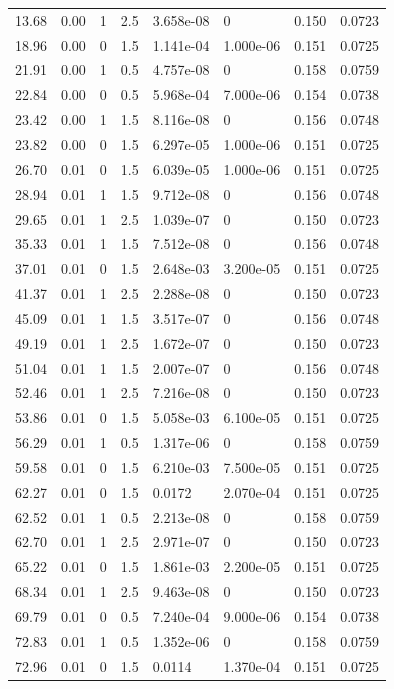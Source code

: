 \documentclass[preview]{standalone}
\begin{document}
{{\begin{tabular}{L{1.2cm}C{1.2cm} C{0.3cm}C{0.5cm} C{1.4cm}C{1.4cm} C{1.4cm}C{1.4cm}}
  13.68  &  0.00  & 1     & 2.5 &  3.658e-08  & 0  & 0.150 &  0.0723   \\ 
  18.96  &  0.00  & 0     & 1.5 &  1.141e-04  & 1.000e-06  & 0.151 &  0.0725   \\ 
  21.91  &  0.00  & 1     & 0.5 &  4.757e-08  & 0  & 0.158 &  0.0759   \\ 
  22.84  &  0.00  & 0     & 0.5 &  5.968e-04  & 7.000e-06  & 0.154 &  0.0738   \\ 
  23.42  &  0.00  & 1     & 1.5 &  8.116e-08  & 0  & 0.156 &  0.0748   \\ 
  23.82  &  0.00  & 0     & 1.5 &  6.297e-05  & 1.000e-06  & 0.151 &  0.0725   \\ 
  26.70  &  0.01  & 0     & 1.5 &  6.039e-05  & 1.000e-06  & 0.151 &  0.0725   \\ 
  28.94  &  0.01  & 1     & 1.5 &  9.712e-08  & 0  & 0.156 &  0.0748   \\ 
  29.65  &  0.01  & 1     & 2.5 &  1.039e-07  & 0  & 0.150 &  0.0723   \\ 
  35.33  &  0.01  & 1     & 1.5 &  7.512e-08  & 0  & 0.156 &  0.0748   \\ 
  37.01  &  0.01  & 0     & 1.5 &  2.648e-03  & 3.200e-05  & 0.151 &  0.0725   \\ 
  41.37  &  0.01  & 1     & 2.5 &  2.288e-08  & 0  & 0.150 &  0.0723   \\ 
  45.09  &  0.01  & 1     & 1.5 &  3.517e-07  & 0  & 0.156 &  0.0748   \\ 
  49.19  &  0.01  & 1     & 2.5 &  1.672e-07  & 0  & 0.150 &  0.0723   \\ 
  51.04  &  0.01  & 1     & 1.5 &  2.007e-07  & 0  & 0.156 &  0.0748   \\ 
  52.46  &  0.01  & 1     & 2.5 &  7.216e-08  & 0  & 0.150 &  0.0723   \\ 
  53.86  &  0.01  & 0     & 1.5 &  5.058e-03  & 6.100e-05  & 0.151 &  0.0725   \\ 
  56.29  &  0.01  & 1     & 0.5 &  1.317e-06  & 0  & 0.158 &  0.0759   \\ 
  59.58  &  0.01  & 0     & 1.5 &  6.210e-03  & 7.500e-05  & 0.151 &  0.0725   \\ 
  62.27  &  0.01  & 0     & 1.5 &  0.0172  & 2.070e-04  & 0.151 &  0.0725   \\ 
  62.52  &  0.01  & 1     & 0.5 &  2.213e-08  & 0  & 0.158 &  0.0759   \\ 
  62.70  &  0.01  & 1     & 2.5 &  2.971e-07  & 0  & 0.150 &  0.0723   \\ 
  65.22  &  0.01  & 0     & 1.5 &  1.861e-03  & 2.200e-05  & 0.151 &  0.0725   \\ 
  68.34  &  0.01  & 1     & 2.5 &  9.463e-08  & 0  & 0.150 &  0.0723   \\ 
  69.79  &  0.01  & 0     & 0.5 &  7.240e-04  & 9.000e-06  & 0.154 &  0.0738   \\ 
  72.83  &  0.01  & 1     & 0.5 &  1.352e-06  & 0  & 0.158 &  0.0759   \\ 
  72.96  &  0.01  & 0     & 1.5 &  0.0114  & 1.370e-04  & 0.151 &  0.0725   \\ 
\hline 
\end{tabular} 

}}
\end{document}
